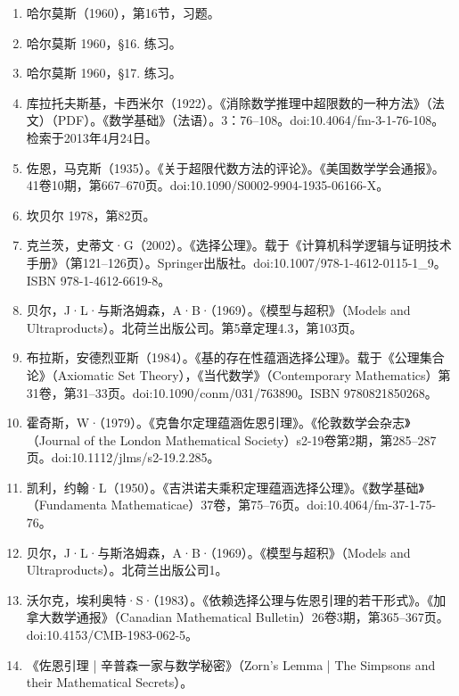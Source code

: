 \begin{enumerate}
\item 哈尔莫斯（1960），第16节，习题。
\item 哈尔莫斯 1960，§16. 练习。
\item 哈尔莫斯 1960，§17. 练习。
\item 库拉托夫斯基，卡西米尔（1922）。《消除数学推理中超限数的一种方法》（法文）（PDF）。《数学基础》（法语）。3：76–108。doi:10.4064/fm-3-1-76-108。检索于2013年4月24日。
\item 佐恩，马克斯（1935）。《关于超限代数方法的评论》。《美国数学学会通报》。41卷10期，第667–670页。doi:10.1090/S0002-9904-1935-06166-X。
\item 坎贝尔 1978，第82页。
\item 克兰茨，史蒂文·G（2002）。《选择公理》。载于《计算机科学逻辑与证明技术手册》（第121–126页）。Springer出版社。doi:10.1007/978-1-4612-0115-1_9。ISBN 978-1-4612-6619-8。
\item 贝尔，J·L·与斯洛姆森，A·B·（1969）。《模型与超积》（Models and Ultraproducts）。北荷兰出版公司。第5章定理4.3，第103页。
\item 布拉斯，安德烈亚斯（1984）。《基的存在性蕴涵选择公理》。载于《公理集合论》（Axiomatic Set Theory），《当代数学》（Contemporary Mathematics）第31卷，第31–33页。doi:10.1090/conm/031/763890。ISBN 9780821850268。
\item 霍奇斯，W·（1979）。《克鲁尔定理蕴涵佐恩引理》。《伦敦数学会杂志》（Journal of the London Mathematical Society）s2-19卷第2期，第285–287页。doi:10.1112/jlms/s2-19.2.285。
\item 凯利，约翰·L（1950）。《吉洪诺夫乘积定理蕴涵选择公理》。《数学基础》（Fundamenta Mathematicae）37卷，第75–76页。doi:10.4064/fm-37-1-75-76。
\item 贝尔，J·L·与斯洛姆森，A·B·（1969）。《模型与超积》（Models and Ultraproducts）。北荷兰出版公司1。
\item 沃尔克，埃利奥特·S·（1983）。《依赖选择公理与佐恩引理的若干形式》。《加拿大数学通报》（Canadian Mathematical Bulletin）26卷3期，第365–367页。doi:10.4153/CMB-1983-062-5。
\item 《佐恩引理 | 辛普森一家与数学秘密》（Zorn's Lemma | The Simpsons and their Mathematical Secrets）。
\end{enumerate}

